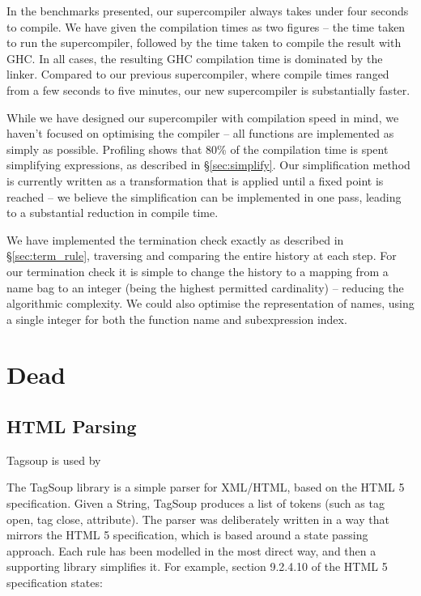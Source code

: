 \documentclass[draft]{sigplanconf}
\begin{document}
In the benchmarks presented, our supercompiler always takes under four seconds to compile. We have given the compilation times as two figures -- the time taken to run the supercompiler, followed by the time taken to compile the result with GHC. In all cases, the resulting GHC compilation time is dominated by the linker. Compared to our previous supercompiler, where compile times ranged from a few seconds to five minutes, our new supercompiler is substantially faster.

While we have designed our supercompiler with compilation speed in mind, we haven't focused on optimising the compiler -- all functions are implemented as simply as possible. Profiling shows that 80\% of the compilation time is spent simplifying expressions, as described in \S\ref{sec:simplify}. Our simplification method is currently written as a transformation that is applied until a fixed point is reached -- we believe the simplification can be implemented in one pass, leading to a substantial reduction in compile time.

We have implemented the termination check exactly as described in \S\ref{sec:term_rule}, traversing and comparing the entire history at each step. For our termination check it is simple to change the history to a mapping from a name bag to an integer (being the highest permitted cardinality) -- reducing the algorithmic complexity. We could also optimise the representation of names, using a single integer for both the function name and subexpression index.

\section{Dead}
\subsection{HTML Parsing}
\label{sec:tagsoup}

Tagsoup is used by \cite{malde:using_tagsoup}

The TagSoup library \cite{tagsoup} is a simple parser for XML/HTML, based on the HTML 5 specification. Given a String, TagSoup produces a list of tokens (such as tag open, tag close, attribute). The parser was deliberately written in a way that mirrors the HTML 5 specification, which is based around a state passing approach. Each rule has been modelled in the most direct way, and then a supporting library simplifies it. For example, section 9.2.4.10 of the HTML 5 specification states:
\end{document}
